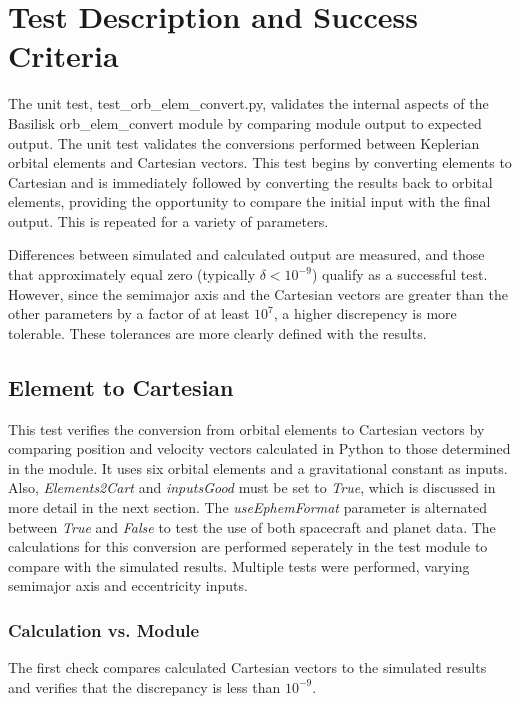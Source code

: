 \section{Test Description and Success Criteria}
The unit test, test\_orb\_elem\_convert.py,  validates the internal aspects of the Basilisk orb\_elem\_convert module by comparing module output to expected output. The unit test validates the conversions performed between Keplerian orbital elements and Cartesian vectors. This test begins by converting elements to Cartesian and is immediately followed by converting the results back to orbital elements, providing the opportunity to compare the initial input with the final output. This is repeated for a variety of parameters. 

Differences between simulated and calculated output are measured, and those that approximately equal zero (typically $\delta < 10^{-9}$) qualify as a successful test. However, since the semimajor axis and the Cartesian vectors are greater than the other parameters by a factor of at least $10^7$, a higher discrepency is more tolerable. These tolerances are more clearly defined with the results.

\subsection{Element to Cartesian}
This test verifies the conversion from orbital elements to Cartesian vectors by comparing position and velocity vectors calculated in Python to those determined in the module. It uses six orbital elements and a gravitational constant as inputs. Also, \textit{Elements2Cart} and \textit{inputsGood} must be set to \textit{True}, which is discussed in more detail in the next section. The \textit{useEphemFormat} parameter is alternated between \textit{True} and \textit{False} to test the use of both spacecraft and planet data. The calculations for this conversion are performed seperately in the test module to compare with the simulated results. Multiple tests were performed, varying semimajor axis and eccentricity inputs.
\subsubsection{Calculation vs. Module}
The first check compares calculated Cartesian vectors to the simulated results and verifies that the discrepancy is less than $10^{-9}$.

